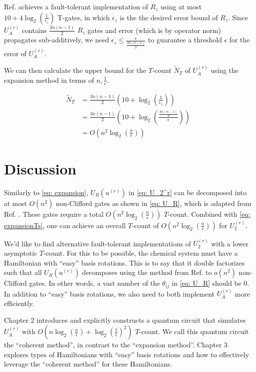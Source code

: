 Ref. \cite{Rz} achieves a fault-tolerant implementation of $R_z$ using at most $10 + 4\log_2(\frac{1}{\epsilon_z})$ T-gates, in which $\epsilon_z$ is the the desired error bound of $R_z$. Since $U_A^{(r)}$ contains $\frac{3n(n - 1)}{2}$ $R_z$ gates and error (which is by operator norm) propagates sub-additively, we need $\epsilon_z \leq \frac{\epsilon}{\frac{3n(n - 1)}{2}}$ to guarantee a threshold $\epsilon$ for the error of $U_A^{(r)}$.

We can then calculate the upper bound for the $T$-count $\tilde{N}_T$ of $U_A^{(r)}$ using the expansion method in terms of $n, \frac{1}{\epsilon}$.

\begin{equation}
    \begin{split}
        \tilde{N}_T &= \frac{3n(n - 1)}{2}(10 + \log_2(\frac{1}{\epsilon_z})) \\
        &= \frac{3n(n - 1)}{2}(10 + \log_2(\frac{\frac{3n(n - 1)}{2}}{\epsilon})) \\
        &= O(n^2\log_2(\frac{n}{\epsilon}))
    \end{split}
    \label{eq: expansionTs}
\end{equation}

\section{Discussion}

Similarly to \eqref{eq: expansion}, $U_R(u^{(r)})$ in \eqref{eq: U_2^r} can be decomposed into at most $O(n^2)$ non-Clifford gates as shown in \eqref{eq: U_R}, which is adapted from Ref. \cite{FSN}. These gates require a total $O(n^2\log_2(\frac{n}{\epsilon}))$ $T$-count. Combined with \eqref{eq: expansionTs}, one can achieve an overall $T$-count of $O(n^2\log_2(\frac{n}{\epsilon}))$ for $U_2^{(r)}$.

We'd like to find alternative fault-tolerant implementations of $U_2^{(r)}$ with a lower asymptotic $T$-count. For this to be possible, the chemical system must have a Hamiltonian with ``easy'' basis rotations. This is to say that it double factorizes such that all $U_R(u^{(r)})$ decomposes using the method from Ref. \cite{FSN} to $o(n^2)$ non-Clifford gates. In other words, a vast number of the $\theta_{ij}$ in \eqref{eq: U_R} should be $0$. In addition to ``easy'' basis rotations, we also need to both implement $U_A^{(r)}$ more efficiently.

Chapter 2 introduces and explicitly constructs a quantum circuit that simulates $U_A^{(r)}$ with $O(n\log_2(\frac{n}{\epsilon}) + \log_2(\frac{1}{\epsilon})^2)$ $T$-count. We call this quantum circuit the ``coherent method'', in contrast to the ``expansion method''. Chapter 3 explores types of Hamiltonians with ``easy'' basis rotations and how to effectively leverage the ``coherent method'' for these Hamiltonians.


